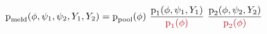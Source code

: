 \begin{equation*}
  \pd_{\text{meld}} (\phi, \psi_{1}, \psi_{2}, Y_{1}, Y_{2})
  =
  \ppoolphi \,\,
  \frac {
    \pd_{1}(\phi, \psi_{1}, Y_{1})
  } {
    \textcolor{myredhighlight}{\pd_{1}(\phi)}
  }
  \,\,
  \frac {
    \pd_{2}(\phi, \psi_{2}, Y_{2})
  } {
    \textcolor{myredhighlight}{\pd_{2}(\phi)}
  }
\end{equation*}